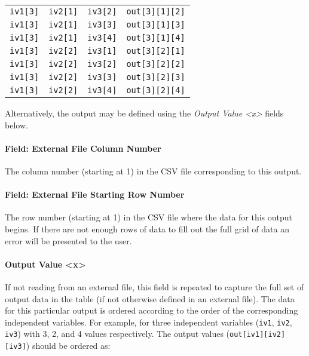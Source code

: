 \begin{longtable}[]{@{}llll@{}}
\texttt{iv1{[}3{]}} & \texttt{iv2{[}1{]}} & \texttt{iv3{[}2{]}} &
\texttt{out{[}3{]}{[}1{]}{[}2{]}}\tabularnewline
\texttt{iv1{[}3{]}} & \texttt{iv2{[}1{]}} & \texttt{iv3{[}3{]}} &
\texttt{out{[}3{]}{[}1{]}{[}3{]}}\tabularnewline
\texttt{iv1{[}3{]}} & \texttt{iv2{[}1{]}} & \texttt{iv3{[}4{]}} &
\texttt{out{[}3{]}{[}1{]}{[}4{]}}\tabularnewline
\texttt{iv1{[}3{]}} & \texttt{iv2{[}2{]}} & \texttt{iv3{[}1{]}} &
\texttt{out{[}3{]}{[}2{]}{[}1{]}}\tabularnewline
\texttt{iv1{[}3{]}} & \texttt{iv2{[}2{]}} & \texttt{iv3{[}2{]}} &
\texttt{out{[}3{]}{[}2{]}{[}2{]}}\tabularnewline
\texttt{iv1{[}3{]}} & \texttt{iv2{[}2{]}} & \texttt{iv3{[}3{]}} &
\texttt{out{[}3{]}{[}2{]}{[}3{]}}\tabularnewline
\texttt{iv1{[}3{]}} & \texttt{iv2{[}2{]}} & \texttt{iv3{[}4{]}} &
\texttt{out{[}3{]}{[}2{]}{[}4{]}}\tabularnewline
\bottomrule
\end{longtable}

Alternatively, the output may be defined using the \emph{Output Value
\textless{}x\textgreater{}} fields below.

\paragraph{Field: External File Column
Number}\label{field-external-file-column-number}

The column number (starting at 1) in the CSV file corresponding to this
output.

\paragraph{Field: External File Starting Row
Number}\label{field-external-file-starting-row-number}

The row number (starting at 1) in the CSV file where the data for this
output begins. If there are not enough rows of data to fill out the full
grid of data an error will be presented to the user.

\paragraph{Output Value
\textless{}x\textgreater{}}\label{output-value-x}

If not reading from an external file, this field is repeated to capture
the full set of output data in the table (if not otherwise defined in an
external file). The data for this particular output is ordered according
to the order of the corresponding independent variables. For example,
for three independent variables (\texttt{iv1}, \texttt{iv2},
\texttt{iv3}) with 3, 2, and 4 values respectively. The output values
(\texttt{out{[}iv1{]}{[}iv2{]}{[}iv3{]}}) should be ordered as:

